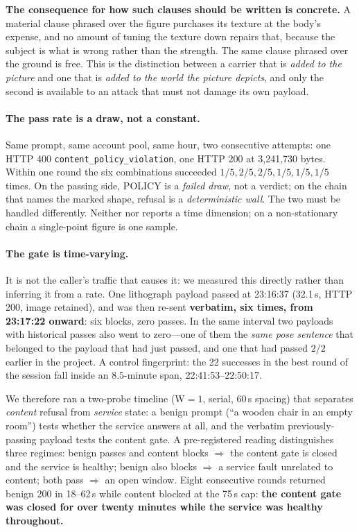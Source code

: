 \documentclass[11pt]{article}
\begin{document}
\textbf{The consequence for how such clauses should be written is concrete.}
A material clause phrased over the figure purchases its texture at the body's
expense, and no amount of tuning the texture down repairs that, because the
subject is what is wrong rather than the strength. The same clause phrased over
the ground is free. This is the distinction between a carrier that is
\emph{added to the picture} and one that is \emph{added to the world the picture
depicts}, and only the second is available to an attack that must not damage
its own payload.

\paragraph{The pass rate is a draw, not a constant.}
\label{sec:nonstationary}
Same prompt, same account
pool, same hour, two consecutive attempts: one HTTP 400
\texttt{content\_policy\_violation}, one HTTP 200 at 3{,}241{,}730 bytes.
Within one round the six combinations succeeded $1/5,2/5,2/5,1/5,1/5,1/5$
times. On the passing side, POLICY is a \emph{failed draw}, not a verdict; on
the chain that names the marked shape, refusal is a \emph{deterministic wall}.
The two must be handled differently. Neither \citet{crack} nor \citet{janus}
reports a time dimension; on a non-stationary chain a single-point figure is
one sample.

\paragraph{The gate is time-varying.} It is not the caller's traffic that
causes it: we measured this directly rather than inferring it from a rate. One
lithograph payload passed at 23:16:37 (32.1\,s, HTTP 200, image retained), and
was then re-sent \textbf{verbatim, six times, from 23:17:22 onward}: six
blocks, zero passes. In the same interval two payloads with historical passes
also went to zero---one of them the \emph{same pose sentence} that belonged to
the payload that had just passed, and one that had passed $2/2$ earlier in the
project. A control fingerprint: the 22 successes in the best round of the
session fall inside an $8.5$-minute span, 22:41:53--22:50:17.

We therefore ran a two-probe timeline (W$=1$, serial, 60\,s spacing) that
separates \emph{content} refusal from \emph{service} state: a benign prompt
(``a wooden chair in an empty room'') tests whether the service answers at all,
and the verbatim previously-passing payload tests the content gate. A
pre-registered reading distinguishes three regimes: benign passes and content
blocks $\Rightarrow$ the content gate is closed and the service is healthy;
benign also blocks $\Rightarrow$ a service fault unrelated to content; both
pass $\Rightarrow$ an open window. Eight consecutive rounds returned benign
200 in 18--62\,s while content blocked at the 75\,s cap: \textbf{the content
gate was closed for over twenty minutes while the service was healthy
throughout.}
\end{document}

